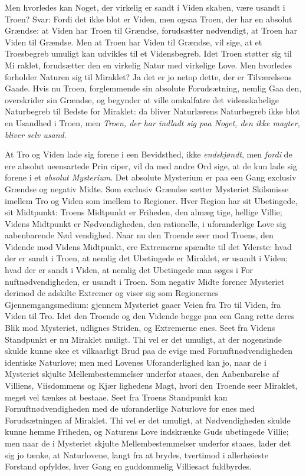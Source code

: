 \documentclass[12pt]{book}
\newcommand{\opage}[1]{\marginnote{\footnotesize\textit{[#1]}}}
\begin{document}
Men hvorledes kan Noget, der virkelig er sandt i Viden\-%
skaben, være usandt i Troen? Svar: Fordi det ikke blot
er Viden, men ogsaa Troen, der har en absolut Grændse:
at Viden har Troen til Grændse, forudsætter nødvendigt,
at Troen har Viden til Grændse. Men at Troen har
Viden til Grændse, vil sige, at et Troesbegreb umuligt kan
udvikles til et Vidensbegreb. Idet Troen støtter sig til Mi\-%
raklet, forudsætter den en virkelig Natur med virkelige Love.
Men hvorledes forholder Naturen sig til Miraklet? Ja det
er jo netop dette, der er Tilværelsens Gaade. Hvis nu
Troen, forglemmende sin absolute Forudsætning, nemlig Gaa\-%
den, overskrider sin Grændse, og begynder at ville omkalfatre
det videnskabelige Naturbegreb til Bedste for Miraklet: da
\opage{33}\setcounter{footnote}{0}%
bliver Naturlærens Naturbegreb ikke blot en Usandhed i
Troen, men \emph{Troen, der har indladt sig paa Noget,
den ikke magter, bliver selv usand}.

At Tro og Viden lade sig forene i een Bevidsthed, ikke
\emph{endskjøndt}, men \emph{fordi} de ere absolut ueensartede Prin\-%
ciper, vil da med andre Ord sige, at de kun lade sig forene
i et \emph{absolut Mysterium}. Det absolute Mysterium er paa
een Gang exclusiv Grændse og negativ Midte. Som exclusiv
Grændse sætter Mysteriet Skilsmisse imellem Tro og Viden
som imellem to Regioner. Hver Region har sit Ubetingede,
sit Midtpunkt: Troens Midtpunkt er Friheden, den almæg\-%
tige, hellige Villie; Videns Midtpunkt er Nødvendigheden,
den rationelle, i uforanderlige Love sig aabenbarende Nød\-%
vendighed. Naar nu den Troende seer mod Troens, den
Vidende mod Videns Midtpunkt, ere Extremerne spændte til
det Yderste: hvad der er sandt i Troen, at nemlig det
Ubetingede er Miraklet, er usandt i Viden; hvad der er
sandt i Viden, at nemlig det Ubetingede maa søges i For\-%
nuftnødvendigheden, er usandt i Troen. Som negativ Midte
forener Mysteriet derimod de adskilte Extremer og viser sig som
Regionernes Gjennemgangsmedium: gjennem Mysteriet gaaer
Veien fra Tro til Viden, fra Viden til Tro. Idet den
Troende og den Vidende begge paa een Gang rette deres
Blik mod Mysteriet, udlignes Striden, og Extremerne enes.
Seet fra Videns Standpunkt er nu Miraklet muligt. Thi
vel er det umuligt, at der nogensinde skulde kunne skee et
vilkaarligt Brud paa de evige med Fornuftnødvendigheden
identiske Naturlove; men med Lovenes Uforanderlighed kan
jo, naar de i Mysteriet skjulte Mellembestemmelser underfor\-%
staaes, den Aabenbarelse af Villiens, Viisdommens og Kjær\-%
lighedens Magt, hvori den Troende seer Miraklet, meget
vel tænkes at bestaae. Seet fra Troens Standpunkt kan
Fornuftnødvendigheden med de uforanderlige Naturlove for\-%
enes med Forudsætningen af Miraklet. Thi vel er det
\opage{34}\setcounter{footnote}{0}%
umuligt, at Nødvendigheden skulde kunne hemme Friheden,
og Naturens Love indskrænke Guds ubetingede Villie; men
naar de i Mysteriet skjulte Mellembestemmelser underfor\-%
staaes, lader det sig jo tænke, at Naturlovene, langt fra at
brydes, tvertimod i allerhøieste Forstand opfyldes, hver Gang
en guddommelig Villiesact fuldbyrdes.
\end{document}
